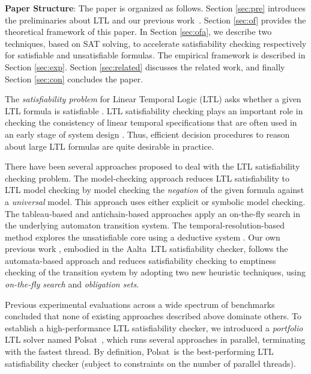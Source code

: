 \documentclass[conference]{IEEEtran}
\def\Polsat{{Polsat}}
\def\Aalta{{Aalta}}
\begin{document}
\noindent
\textbf{Paper Structure}: The paper is organized as
follows. Section \ref{sec:pre} introduces the preliminaries about LTL and our
previous work~\cite{LZPVH13}. Section \ref{sec:of} provides the theoretical
framework of this paper. In Section \ref{sec:ofa}, we describe two techniques, 
based on SAT solving, to accelerate satisfiability checking respectively for
satisfiable and unsatisfiable formulas. The empirical framework
is described in Section \ref{sec:exp}. Section \ref{sec:related} discusses the related work, and finally Section \ref{sec:con} concludes the paper.\fi

The \emph{satisfiability problem} for Linear Temporal Logic (LTL)
asks whether a given LTL formula is satisfiable \cite{SC85}.  LTL 
satisfiability checking plays an important role in checking the 
consistency of linear temporal specifications that are often used 
in an early stage of system design \cite{RV10,RV11}.  Thus, efficient 
decision procedures to reason about large LTL formulas are quite 
desirable in practice.  

There have been several approaches proposed to deal with the LTL
satisfiability checking problem.  The model-checking 
approach reduces LTL satisfiability to LTL model checking by model checking
the \emph{negation} of the given formula against a \emph{universal} model.
This approach uses either explicit \cite{RV10} or symbolic \cite{RV11}
model checking.  The tableau-based \cite{Sch98} and antichain-based
\cite{DDMR08} approaches apply an on-the-fly search in the underlying 
automaton transition system.  The temporal-resolution-based method 
explores the unsatisfiable core using a deductive system \cite{HK03}. 
Our own previous work \cite{LZPVH13}, embodied in the \Aalta\ LTL 
satisfiability checker, follows the automata-based approach and reduces 
satisfiability checking to emptiness checking of the transition system 
by adopting two new heuristic techniques, using \emph{on-the-fly search} and 
\emph{obligation sets}.

Previous experimental evaluations across a wide spectrum of benchmarks 
\cite{RV10,RV11,SD11} concluded that none of existing approaches
described above dominate others. To establish a high-performance LTL 
satisfiability checker, we introduced a \emph{portfolio} LTL solver named 
\Polsat\ \cite{LPZVHCoRR13}, which runs several approaches in parallel,
terminating with the fastest thread. By definition, \Polsat\ is the
best-performing LTL satisfiability checker (subject to
constraints on the number of parallel threads).
\end{document}
